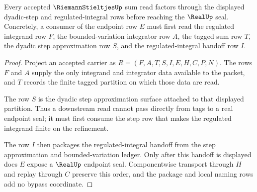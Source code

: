 \begin{theorem}
\label{thm:riemann-stieltjes-regulated-integral-handoff}
Every accepted $\RiemannStieltjesUp$ sum read factors through the displayed dyadic-step and regulated-integral rows before reaching the $\RealUp$ seal. Concretely, a consumer of the endpoint row $E$ must first read the regulated integrand row $F$, the bounded-variation integrator row $A$, the tagged sum row $T$, the dyadic step approximation row $S$, and the regulated-integral handoff row $I$.
\end{theorem}
\begin{proof}
Project an accepted carrier as $R=(F,A,T,S,I,E,H,C,P,N)$. The rows $F$ and $A$ supply the only integrand and integrator data available to the packet, and $T$ records the finite tagged partition on which those data are read.

The row $S$ is the dyadic step approximation surface attached to that displayed partition. Thus a downstream read cannot pass directly from tags to a real endpoint seal; it must first consume the step row that makes the regulated integrand finite on the refinement.

The row $I$ then packages the regulated-integral handoff from the step approximation and bounded-variation ledger. Only after this handoff is displayed does $E$ expose a $\RealUp$ endpoint seal. Componentwise transport through $H$ and replay through $C$ preserve this order, and the package and local naming rows add no bypass coordinate.
\end{proof}

